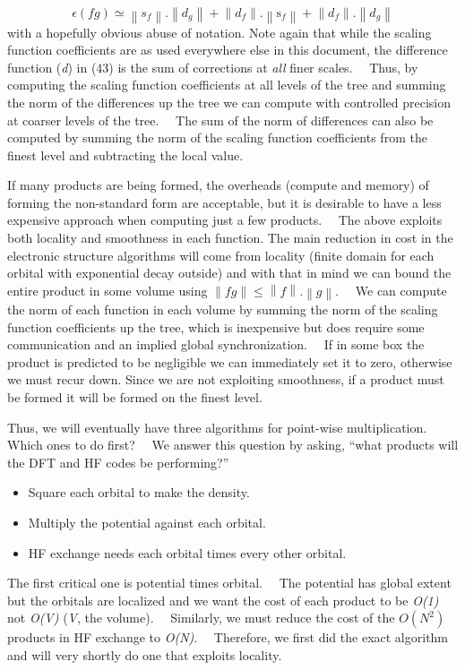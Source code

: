 \documentclass[letterpaper]{book}
\begin{document}
\begin{equation}\label{seq:refText42}
\epsilon (\mathit{fg})\simeq
\left\|s_{f}\right\|.\left\|d_{g}\right\|+\left\|d_{f}\right\|.\left\|\mathrm{{s}}_{f}\right\|+\left\|d_{f}\right\|.\left\|d_{g}\right\|
\end{equation}
with a hopefully obvious abuse of notation. Note again that while the scaling function coefficients are as used
everywhere else in this document, the difference function (\textit{d}) in (43) is the sum of corrections at \textit{all
}finer scales. \ \ Thus, by computing the scaling function coefficients at all levels of the tree and summing the norm
of the differences up the tree we can compute with controlled precision at coarser levels of the tree. \ \ The sum of
the norm of differences can also be computed by summing the norm of the scaling function coefficients from the finest
level and subtracting the local value.

If many products are being formed, the overheads (compute and memory) of forming the non-standard form are acceptable,
but it is desirable to have a less expensive approach when computing just a few products. \ \ The above exploits both
locality and smoothness in each function. The main reduction in cost in the electronic structure algorithms will come
from locality (finite domain for each orbital with exponential decay outside) and with that in mind we can bound the
entire product in some volume using  $\left\|\mathit{fg}\right\|\le \left\|f\right\|.\left\|g\right\|$. \ \ We can
compute the norm of each function in each volume by summing the norm of the scaling function coefficients up the tree,
which is inexpensive but does require some communication and an implied global synchronization. \ \ If in some box the
product is predicted to be negligible we can immediately set it to zero, otherwise we must recur down. Since we are not
exploiting smoothness, if a product must be formed it will be formed on the finest level.

Thus, we will eventually have three algorithms for point-wise multiplication. Which ones to do first? \ \ We answer this
question by asking, ``what products will the DFT and HF codes be performing?''

\begin{itemize}
\item Square each orbital to make the density.
\item Multiply the potential against each orbital.
\item HF exchange needs each orbital times every other orbital.
\end{itemize}
The first critical one is potential times orbital. \ \ The potential has global extent but the orbitals are localized
and we want the cost of each product to be \textit{O(1)} not \textit{O(V)} (\textit{V}, the volume). \ \ Similarly, we
must reduce the cost of the  $O(N^{2})$ products in HF exchange to \textit{O(N)}. \ \ Therefore, we first did the exact
algorithm and will very shortly do one that exploits locality.
\end{document}
